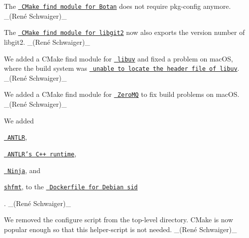 \begin{DoxyItemize}
\item The \href{https://master.libelektra.org/scripts/cmake/Modules/FindLibgcrypt.cmake}{\texttt{ C\+Make find module for Botan}} does not require {\ttfamily pkg-\/config} anymore. \+\_\+(René Schwaiger)\+\_\+
\item The \href{https://master.libelektra.org/scripts/cmake/Modules/FindLibGit2.cmake}{\texttt{ C\+Make find module for libgit2}} now also exports the version number of libgit2. \+\_\+(René Schwaiger)\+\_\+
\item We added a C\+Make find module for \href{https://libuv.org}{\texttt{ libuv}} and fixed a problem on mac\+OS, where the build system was \href{https://cirrus-ci.com/task/4852008365326336}{\texttt{ unable to locate the header file of libuv}}. \+\_\+(René Schwaiger)\+\_\+
\item We added a C\+Make find module for \href{http://zeromq.org}{\texttt{ Zero\+MQ}} to fix build problems on mac\+OS. \+\_\+(René Schwaiger)\+\_\+
\end{DoxyItemize}


\begin{DoxyItemize}
\item We added
\begin{DoxyItemize}
\item \href{https://packages.debian.org/sid/antlr4}{\texttt{ A\+N\+T\+LR}},
\item \href{https://packages.debian.org/sid/libantlr4-runtime-dev}{\texttt{ A\+N\+T\+L\+R’s C++ runtime}},
\item \href{https://packages.debian.org/sid/ninja-build}{\texttt{ Ninja}}, and
\item \href{https://github.com/mvdan/sh}{\texttt{ {\ttfamily shfmt}}}, to the \href{https://master.libelektra.org/scripts/docker/debian/sid/Dockerfile}{\texttt{ Dockerfile for Debian sid}}
\end{DoxyItemize}

. \+\_\+(René Schwaiger)\+\_\+
\end{DoxyItemize}


\begin{DoxyItemize}
\item We removed the {\ttfamily configure} script from the top-\/level directory. C\+Make is now popular enough so that this helper-\/script is not needed. \+\_\+(René Schwaiger)\+\_\+
\end{DoxyItemize}


